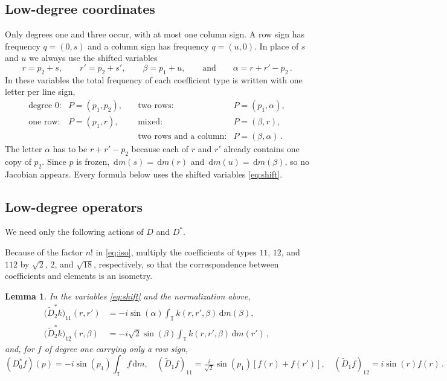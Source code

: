 \documentclass[11pt]{amsart}
\theoremstyle{plain}
\newtheorem{lemma}[theorem]{Lemma}
\theoremstyle{definition}
\newcommand{\T}{\mathbb T}
\newcommand{\1}{\mathbf 1}
\newcommand{\dd}{\,\mathrm d}
\begin{document}
\subsection{Low-degree coordinates}\label{ssec:low-coordinates}

Only degrees one and three occur, with at most one column sign.  A row sign
has frequency $q=(0,s)$ and a column sign has frequency
$q=(u,0)$.  In place of $s$ and $u$ we always use the shifted variables
\begin{equation}\label{eq:shift}
  r=p_2+s,\qquad r'=p_2+s',\qquad \beta=p_1+u,
  \qquad\text{and}\qquad \alpha=r+r'-p_2\, .
\end{equation}
In these variables the total frequency of each coefficient type is written
with one letter per line sign,
\[
\renewcommand{\arraystretch}{1.15}
\begin{array}{llll}
  \text{degree $0$:} & P=(p_1,p_2), &\quad
  \text{two rows:} & P=(p_1,\alpha),\\
  \text{one row:} & P=(p_1,r), &\quad
  \text{mixed:} & P=(\beta,r),\\
  & &\quad \text{two rows and a column:} & P=(\beta,\alpha)\, .
\end{array}
\]
The letter $\alpha$ has to be $r+r'-p_2$ because each of $r$ and $r'$ already
contains one copy of $p_2$.  Since $p$ is frozen, $\dd m(s)=\dd m(r)$ and
$\dd m(u)=\dd m(\beta)$, so no Jacobian appears.  Every formula below uses
the shifted variables \eqref{eq:shift}.

\subsection{Low-degree operators}\label{ssec:low-operators}

We need only the following actions of $D$ and $D^*$.

Because of the factor $n!$ in \eqref{eq:iso}, multiply the coefficients of
types $11$, $12$, and $112$ by
$\sqrt2$, $2$, and $\sqrt{18}$, respectively, so that the correspondence
between coefficients and elements is an isometry.

\begin{lemma}\label{lem:formulas}
In the variables \eqref{eq:shift} and the normalization above,
\begin{align}
  \bigl(\widetilde D_2^*k\bigr)_{11}(r,r')
  &=-i\sin(\alpha)\int_\T k(r,r',\beta)\dd m(\beta),\label{eq:D2a}\\
  \bigl(\widetilde D_2^*k\bigr)_{12}(r,\beta)
  &=-i\sqrt2\sin(\beta)\int_\T k(r,r',\beta)\dd m(r')\, ,\label{eq:D2b}
\end{align}
and, for $f$ of degree one carrying only a row sign,
\begin{equation}\label{eq:D1}
  (D_0^*f)(p)=-i\sin (p_1)\int_\T f\dd m,\quad
  (\widetilde D_1f)_{11}=\tfrac i{\sqrt2}\sin (p_1)[f(r)+f(r')],\quad
  (\widetilde D_1f)_{12}=i\sin (r)f(r)\, .
\end{equation}
\end{lemma}
\end{document}
